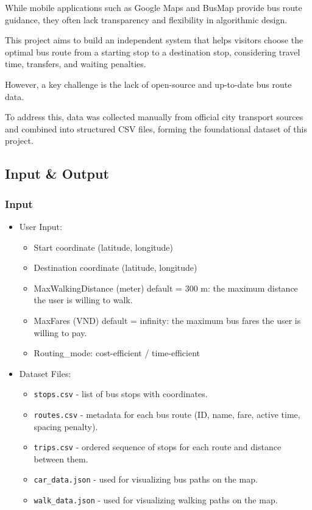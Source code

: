 While mobile applications such as Google Maps and BusMap provide bus route guidance, they often lack transparency and flexibility in algorithmic design.

This project aims to build an independent system that helps visitors choose the optimal bus route from a starting stop to a destination stop, considering travel time, transfers, and waiting penalties.

However, a key challenge is the lack of open-source and up-to-date bus route data.

To address this, data was collected manually from official city transport sources and combined into structured CSV files, forming the foundational dataset of this project.
\subsection{Input \& Output}
\subsubsection{Input}
\begin{itemize}
    \item User Input:
    \begin{itemize}
        \item Start coordinate (latitude, longitude)
        \item Destination coordinate (latitude, longitude)
        \item MaxWalkingDistance (meter) {default = 300 m}: the maximum distance the user is willing to walk.
        \item MaxFares (VND) {default = infinity}: the maximum bus fares the user is willing to pay.
        \item Routing\_mode: cost-efficient / time-efficient
    \end{itemize}
    \item Dataset Files:
    \begin{itemize}
        \item \texttt{stops.csv} - list of bus stops with coordinates.
        \item \texttt{routes.csv} - metadata for each bus route (ID, name, fare, active time, spacing penalty).
        \item \texttt{trips.csv} - ordered sequence of stops for each route and distance between them.
        \item \texttt{car\_data.json} - used for visualizing bus paths on the map.
        \item \texttt{walk\_data.json} - used for visualizing walking paths on the map.
    \end{itemize}
\end{itemize}

